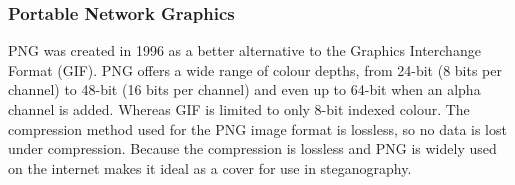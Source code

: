 \subsubsection*{Portable Network Graphics}
PNG was created in 1996 as a better alternative to the Graphics Interchange Format (GIF).
PNG offers a wide range of colour depths, from 24-bit (8 bits per channel) to 48-bit (16 bits per channel) and even up to 64-bit when an alpha channel is added.
Whereas GIF is limited to only 8-bit indexed colour.
The compression method used for the PNG image format is lossless, so no data is lost under compression.
Because the compression is lossless and PNG is widely used on the internet makes it ideal as a cover for use in steganography.



